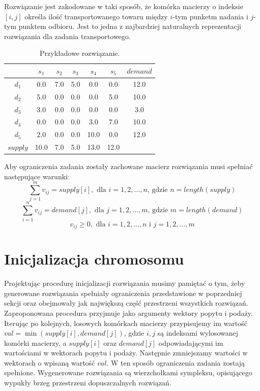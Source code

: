 Rozwiązanie jest zakodowane w taki sposób, że komórka macierzy o indeksie $[i, j]$ określa ilość transportowanego towaru 
między $i$-tym punketm nadania i $j$-tym punktem odbioru. Jest to jedna z najbardziej naturalnych reprezentacji rozwiązania 
dla zadania transportowego.

\begin{table}[h!]
    \begin{center}
        \begin{tabular}{c||ccccc||c}
              & $s_1$ & $s_2$ & $s_3$ & $s_4$ & $s_5$ & $demand$ \\ 
            \hline
            \hline
            $d_1$ & 0.0 & 7.0 & 5.0 & 0.0 & 0.0 & 12.0 \\
            $d_2$ & 5.0 & 0.0 & 0.0 & 0.0 & 5.0 & 10.0 \\
            $d_3$ & 3.0 & 0.0 & 0.0 & 0.0 & 0.0 & 3.0 \\
            $d_4$ & 0.0 & 0.0 & 0.0 & 3.0 & 7.0 & 10.0 \\
            $d_5$ & 2.0 & 0.0 & 0.0 & 10.0 & 0.0 & 12.0 \\
            \hline
            \hline
            $supply$ & 10.0 & 7.0 & 5.0 & 13.0 & 12.0 & \\ 
        \end{tabular}
    \end{center}
    \caption{Przykładowe rozwiązanie.}
\end{table}

Aby ograniczenia zadania zostały zachowane macierz rozwiązania musi spełniać następujące warunki:
$$\sum_{j=1}^{m} v_{ij} = supply[i], \text{ dla } i = 1, 2, \dots, n \text{, gdzie } n = length(supply)$$
$$\sum_{i=1}^{n} v_{ij} = demand[j], \text{ dla } j = 1, 2, \dots, m \text{, gdzie } m = length(demand)$$
$$v_{ij} \ge 0, \text{ dla } i = 1, 2, \dots, n \text{ i } j = 1, 2, \dots, m$$


\section{Inicjalizacja chromosomu}
Projektując procedurę inicjalizacji rozwiązania musimy pamiętać o tym, żeby generowane rozwiązania spełniały ograniczenia przedstawione 
w poprzedniej sekcji oraz obejmowały jak największą część przestrzeni wszystkich rozwiązań. Zaproponowana procedura przyjmuje jako argumenty 
wektory popytu i podaży. Iterując po kolejnych, losowych komórkach macierzy przypisujemy im wartość $val = \min(supply[i], demand[j])$, gdzie 
$i, j$ są indeksami wylosowanej komórki macierzy, a $supply[i]$ oraz $demand[j]$ odpowiadającymi im wartościami w wektorach popytu i podaży. 
Następnie zmniejszamy wartości w wektorach o wpisaną wartość $val$. W ten sposób ograniczenia zadania zostają spełnione. Wygenerowane rozwiązania są 
wierzchołkami sympleksu, opisującego wypukły brzeg przestrzeni dopuszczalnych rozwiązań.

